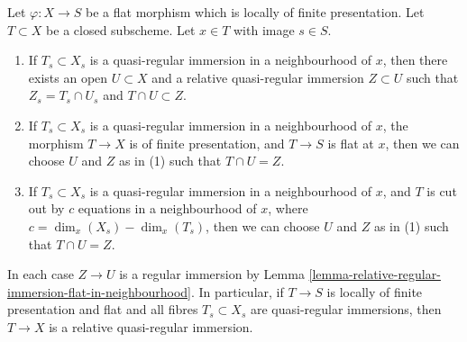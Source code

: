 \begin{lemma}
\label{lemma-fibre-quasi-regular}
Let $\varphi : X \to S$ be a flat morphism which is locally of finite
presentation. Let $T \subset X$ be a closed subscheme.
Let $x \in T$ with image $s \in S$.
\begin{enumerate}
\item If $T_s \subset X_s$ is a quasi-regular immersion
in a neighbourhood of $x$, then there exists an open
$U \subset X$ and a relative quasi-regular immersion
$Z \subset U$ such that $Z_s = T_s \cap U_s$ and $T \cap U \subset Z$.
\item If $T_s \subset X_s$ is a quasi-regular immersion
in a neighbourhood of $x$, the morphism $T \to X$ is of finite
presentation, and $T \to S$ is flat at $x$, then we can choose $U$ and
$Z$ as in (1) such that $T \cap U = Z$.
\item If $T_s \subset X_s$ is a quasi-regular immersion in a neighbourhood
of $x$, and $T$ is cut out by $c$ equations in a neighbourhood of $x$,
where $c = \dim_x(X_s) - \dim_x(T_s)$, then we can choose $U$ and $Z$ as in (1)
such that $T \cap U = Z$.
\end{enumerate}
In each case $Z \to U$ is a regular immersion by
Lemma \ref{lemma-relative-regular-immersion-flat-in-neighbourhood}.
In particular, if $T \to S$ is locally of finite presentation and flat and
all fibres $T_s \subset X_s$ are quasi-regular immersions, then
$T \to X$ is a relative quasi-regular immersion.
\end{lemma}

